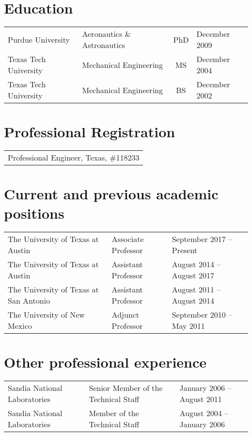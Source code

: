 \ifdefined\iscockrell
\section*{Education}

\begin{tabular}{llcl}
    Purdue University & Aeronautics \& Astronautics & PhD & December 2009 \\
    Texas Tech University & Mechanical Engineering & MS & December 2004 \\
    Texas Tech University & Mechanical Engineering & BS & December 2002
\end{tabular}

\section*{Professional Registration}

\begin{tabular}{l}
    Professional Engineer, Texas, \#118233
\end{tabular}


\section*{Current and previous academic positions}

\begin{tabular}{lll}
    The University of Texas at Austin  & Associate Professor & September 2017 -- Present \\
    The University of Texas at Austin  & Assistant Professor & August 2014 -- August 2017 \\
    The University of Texas at San Antonio & Assistant Professor & August 2011 -- August 2014 \\
    The University of New Mexico & Adjunct Professor & September 2010 -- May 2011
\end{tabular}

\section*{Other professional experience}

\begin{tabular}{lll}
    Sandia National Laboratories  & Senior Member of the Technical Staff  & January 2006 -- August 2011 \\
    Sandia National Laboratories  & Member of the Technical Staff &  August 2004 -- January 2006
\end{tabular}

